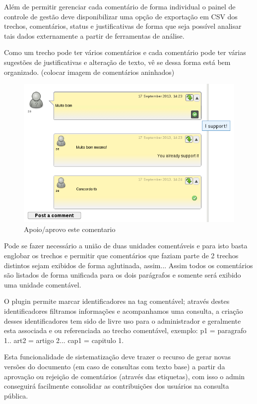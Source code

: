 \documentclass[12pt]{article}
\begin{document}
Além de permitir gerenciar cada comentário de forma individual o painel de
controle de gestão deve disponibilizar uma opção de exportação em CSV dos
trechos, comentários, status e justificativas de forma que seja possível
analisar tais dados externamente a partir de ferramentas de análise.

Como um trecho pode ter vários comentários e cada comentário pode ter várias
sugestões de justificativas e alteração de texto, vê se dessa forma está bem
organizado. (colocar imagem de comentários aninhados)

\begin{figure}[h]
\center
\includegraphics[scale=0.5]{support-on-comment.png}
\caption{Apoio/aprovo este comentario}
\label{support-on-comment}
\end{figure}


Pode se fazer necessário a união de duas unidades comentáveis e para isto
basta englobar os trechos e permitir que comentários que faziam parte de 2
trechos distintos sejam exibidos de forma aglutinada, assim... Assim todos os
comentários são listados de forma unificada para os dois parágrafos e somente
será exibido uma unidade comentável.

O plugin permite marcar identificadores na tag comentável; através destes
identificadores filtramos informações e acompanhamos uma consulta, a criação
desses identificadores tem sido de livre uso para o administrador e geralmente
esta associada e ou referenciada ao trecho comentável, exemplo: p1 = paragrafo
1.. art2 = artigo 2... cap1 = capitulo 1.

Esta funcionalidade de sistematização deve trazer o recurso de gerar novas
versões do documento (em caso de consultas com texto base) a partir da
aprovação ou rejeição de comentários (através das etiquetas), com isso o admin
conseguirá facilmente consolidar as contribuições dos usuários na consulta
pública.
\end{document}
